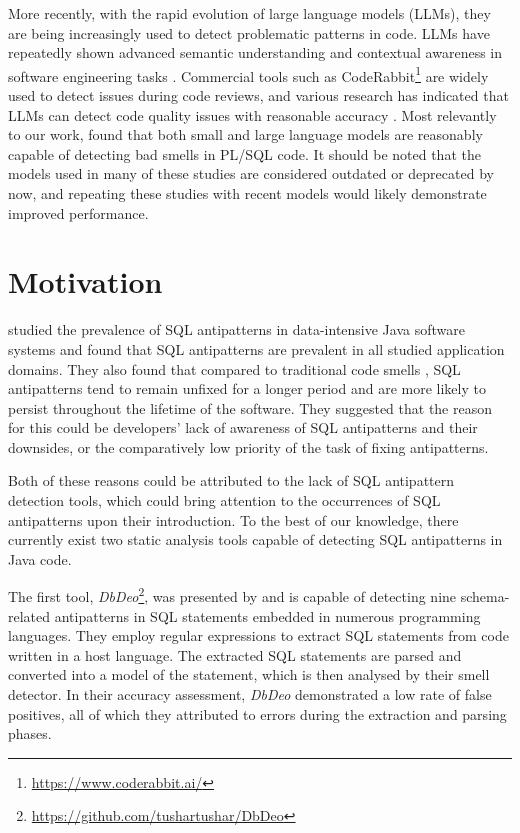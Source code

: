 \documentclass{article}
\begin{document}
More recently, with the rapid evolution of large language models (LLMs), they are being increasingly used to detect problematic patterns in code. LLMs have repeatedly shown advanced semantic understanding and contextual awareness in software engineering tasks \cite{DBLP:journals/corr/abs-2107-03374,DBLP:journals/corr/abs-2306-03091}. Commercial tools such as CodeRabbit\footnote{\hyperlink{https://www.coderabbit.ai/}{https://www.coderabbit.ai/}} are widely used to detect issues during code reviews, and various research has indicated that LLMs can detect code quality issues with reasonable accuracy \cites{DBLP:conf/sbes/GomesSMP25}{blaauwendraad2025evaluating}{sadik2025benchmarking}{DBLP:conf/esem/SilvaSMAV24}. Most relevantly to our work, \textcite[p. 410]{de2025effectiveness} found that both small and large language models are reasonably capable of detecting bad smells in PL/SQL code. It should be noted that the models used in many of these studies are considered outdated or deprecated by now, and repeating these studies with recent models would likely demonstrate improved performance.

\section{Motivation}

\textcite{muse2020prevalence} studied the prevalence of SQL antipatterns in data-intensive Java software systems and found that SQL antipatterns are prevalent in all studied application domains. They also found that compared to traditional code smells \cite[Ch. 3]{fowler2019refactoring}, SQL antipatterns tend to remain unfixed for a longer period and are more likely to persist throughout the lifetime of the software. They suggested that the reason for this could be developers' lack of awareness of SQL antipatterns and their downsides, or the comparatively low priority of the task of fixing antipatterns.

Both of these reasons could be attributed to the lack of SQL antipattern detection tools, which could bring attention to the occurrences of SQL antipatterns upon their introduction. To the best of our knowledge, there currently exist two static analysis tools capable of detecting SQL antipatterns in Java code. 

The first tool, \emph{DbDeo}\footnote{\hyperlink{https://github.com/tushartushar/DbDeo}{https://github.com/tushartushar/DbDeo}}, was presented by \textcite{sharma2018smelly} and is capable of detecting nine schema-related antipatterns in SQL statements embedded in numerous programming languages. They employ regular expressions to extract SQL statements from code written in a host language. The extracted SQL statements are parsed and converted into a model of the statement, which is then analysed by their smell detector. In their accuracy assessment, \emph{DbDeo} demonstrated a low rate of false positives, all of which they attributed to errors during the extraction and parsing phases.
\end{document}
